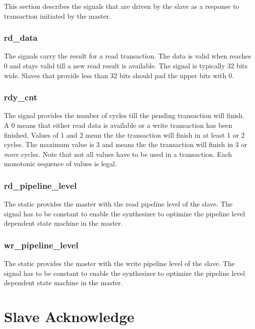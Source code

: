 This section describes the signals that are driven by the slave as a
response to transaction initiated by the master.

\subsubsection{rd\_data}

The  signals carry the result for a read transaction.
The data is valid when  reaches 0 and stays valid
till a new read result is available. The signal is typically 32 bits
wide. Slaves that provide less than 32 bits should pad the upper
bits with 0.

\subsubsection{rdy\_cnt}

The  signal provides the number of cycles till the
pending transaction will finish. A 0 means that either read data is
available or a write transaction has been finished. Values of 1 and
2 mean the the transaction will finish in at least 1 or 2 cycles.
The maximum value is 3 and means the the transaction will finish in
3 or \emph{more} cycles. Note that not all values have to be used in
a transaction. Each monotonic sequence of  values is
legal.

\subsubsection{rd\_pipeline\_level}

The static  provides the master with the
read pipeline level of the slave. The signal has to be constant to
enable the synthesizer to optimize the pipeline level dependent
state machine in the master.


\subsubsection{wr\_pipeline\_level}

The static  provides the master with the
write pipeline level of the slave. The signal has to be constant to
enable the synthesizer to optimize the pipeline level dependent
state machine in the master.

\section{Slave Acknowledge}
\label{sec:ack}

